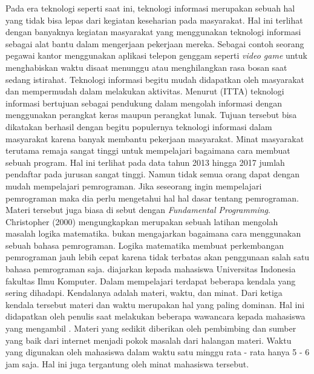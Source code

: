 Pada era teknologi seperti saat ini, teknologi informasi merupakan sebuah hal yang tidak bisa lepas dari kegiatan keseharian pada masyarakat. Hal ini terlihat dengan banyaknya kegiatan masyarakat yang menggunakan teknologi informasi sebagai alat bantu dalam mengerjaan pekerjaan mereka. Sebagai contoh seorang pegawai kantor menggunakan aplikasi telepon genggam seperti \textit{video game} untuk menghabiskan waktu disaat menunggu atau menghilangkan rasa bosan saat sedang istirahat.
\linebreak
\linebreak
Teknologi informasi begitu mudah didapatkan oleh masyarakat dan mempermudah dalam melakukan aktivitas. Menurut \ITTA (ITTA) teknologi informasi bertujuan sebagai pendukung dalam mengolah informasi dengan menggunakan perangkat keras maupun perangkat lunak. Tujuan tersebut bisa dikatakan berhasil dengan begitu populernya teknologi informasi dalam masyarakat karena banyak membantu pekerjaan masyarakat.
\linebreak\linebreak
Minat masyarakat terutama remaja sangat tinggi untuk mempelajari bagaimana cara membuat sebuah program. Hal ini terlihat pada data tahun 2013 hingga 2017 jumlah pendaftar pada jurusan  \program sangat tinggi. Namun tidak semua orang dapat dengan mudah mempelajari pemrograman. Jika seseorang ingin mempelajari pemrograman maka dia perlu mengetahui hal hal dasar tentang pemrograman. Materi tersebut juga biasa di sebut dengan \textit{Fundamental Programming}.
\linebreak\linebreak
Christopher (2000) mengungkapkan \ddp merupakan sebuah latihan mengolah masalah logika matematika. \DDP bukan mengajarkan bagaimana cara menggunakan sebuah bahasa pemrograman. Logika matematika membuat perkembangan pemrograman jauh lebih cepat karena tidak terbatas akan penggunaan salah satu bahasa pemrograman saja.
\linebreak\linebreak
\DDP diajarkan kepada mahasiswa Universitas Indonesia fakultas Ilmu Komputer. Dalam mempelajari \ddp terdapat beberapa kendala yang sering dihadapi. Kendalanya adalah materi, waktu, dan minat. Dari ketiga kendala tersebut materi dan waktu merupakan hal yang paling dominan. Hal ini didapatkan oleh penulis saat melakukan beberapa wawancara kepada mahasiswa yang mengambil \ddp. Materi yang sedikit diberikan oleh pembimbing dan sumber yang baik dari internet menjadi pokok masalah dari halangan materi. Waktu yang digunakan oleh mahasiswa dalam waktu satu minggu rata - rata hanya 5 - 6 jam saja. Hal ini juga tergantung oleh minat mahasiswa tersebut.
